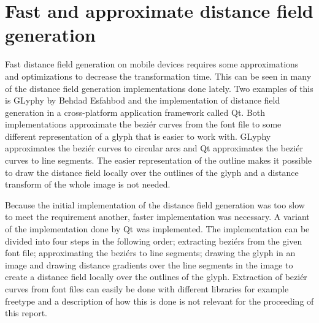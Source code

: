 \section{Fast and approximate distance field generation}
Fast distance field generation on mobile devices requires some approximations and optimizations to decrease the transformation time. This can be seen in many of the distance field generation implementations done lately. Two examples of this is GLyphy by Behdad Esfahbod and the implementation of distance field generation in a cross-platform application framework called Qt. Both implementations approximate the beziér curves from the font file to some different representation of a glyph that is easier to work with. GLyphy approximates the beziér curves to circular arcs and Qt approximates the beziér curves to line segments. The easier representation of the outline makes it possible to draw the distance field locally over the outlines of the glyph and a distance transform of the whole image is not needed.

Because the initial implementation of the distance field generation was too slow to meet the requirement another, faster implementation was necessary. A variant of the implementation done by Qt was implemented. The implementation can be divided into four steps in the following order; extracting beziérs from the given font file; approximating the beziérs to line segments; drawing the glyph in an image and drawing distance gradients over the line segments in the image to create a distance field locally over the outlines of the glyph. Extraction of beziér curves from font files can easily be done with different libraries for example freetype and a description of how this is done is not relevant for the proceeding of this report. 
